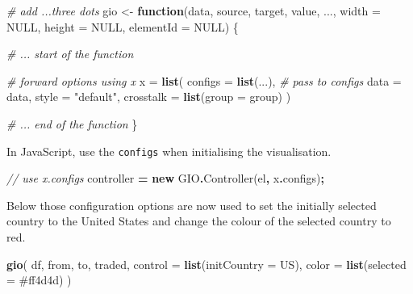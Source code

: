 \documentclass[
]{krantz}
\makeatletter
\newenvironment{Shaded}{\begin{snugshade}}{\end{snugshade}}
\newcommand{\AttributeTok}[1]{\textcolor[rgb]{0.61,0.61,0.61}{#1}}
\newcommand{\CommentTok}[1]{\textcolor[rgb]{0.37,0.37,0.37}{\textit{#1}}}
\newcommand{\ControlFlowTok}[1]{\textcolor[rgb]{0.27,0.27,0.27}{\textbf{#1}}}
\newcommand{\DataTypeTok}[1]{\textcolor[rgb]{0.27,0.27,0.27}{#1}}
\newcommand{\FunctionTok}[1]{\textcolor[rgb]{0,0,0}{#1}}
\newcommand{\KeywordTok}[1]{\textcolor[rgb]{0.27,0.27,0.27}{\textbf{#1}}}
\newcommand{\NormalTok}[1]{#1}
\newcommand{\OperatorTok}[1]{\textcolor[rgb]{0.43,0.43,0.43}{\textbf{#1}}}
\newcommand{\OtherTok}[1]{\textcolor[rgb]{0.37,0.37,0.37}{#1}}
\newcommand{\StringTok}[1]{\textcolor[rgb]{0.5,0.5,0.5}{#1}}
\newenvironment{kframe}{%
\medskip{}
\setlength{\fboxsep}{.8em}
 \def\at@end@of@kframe{}%
 \ifinner\ifhmode%
  \def\at@end@of@kframe{\end{minipage}}%
  \begin{minipage}{\columnwidth}%
 \fi\fi%
 \def\FrameCommand##1{\hskip\@totalleftmargin \hskip-\fboxsep
 \colorbox{shadecolor}{##1}\hskip-\fboxsep
     \hskip-\linewidth \hskip-\@totalleftmargin \hskip\columnwidth}%
 \MakeFramed {\advance\hsize-\width
   \@totalleftmargin\z@ \linewidth\hsize
   \@setminipage}}%
 {\par\unskip\endMakeFramed%
 \at@end@of@kframe}
\renewenvironment{Shaded}{\begin{kframe}}{\end{kframe}}
\makeatother
\begin{document}
\begin{Shaded}
\begin{Highlighting}[]
\CommentTok{\# add ...three dots}
\NormalTok{gio \textless{}{-}}\StringTok{ }\ControlFlowTok{function}\NormalTok{(data, source, target, value, ..., }
  \DataTypeTok{width =} \OtherTok{NULL}\NormalTok{, }\DataTypeTok{height =} \OtherTok{NULL}\NormalTok{, }\DataTypeTok{elementId =} \OtherTok{NULL}\NormalTok{) \{}

  \CommentTok{\# ... start of the function}

  \CommentTok{\# forward options using x}
\NormalTok{  x =}\StringTok{ }\KeywordTok{list}\NormalTok{(}
    \DataTypeTok{configs =} \KeywordTok{list}\NormalTok{(...), }\CommentTok{\# pass to configs}
    \DataTypeTok{data =}\NormalTok{ data,}
    \DataTypeTok{style =} \StringTok{"default"}\NormalTok{,}
    \DataTypeTok{crosstalk =} \KeywordTok{list}\NormalTok{(}\DataTypeTok{group =}\NormalTok{ group)}
\NormalTok{  )}

  \CommentTok{\# ... end of the function}
\NormalTok{\}}
\end{Highlighting}
\end{Shaded}

In JavaScript, use the \texttt{configs} when initialising the visualisation.

\begin{Shaded}
\begin{Highlighting}[]
\CommentTok{// use x.configs}
\NormalTok{controller }\OperatorTok{=} \KeywordTok{new}\NormalTok{ GIO}\OperatorTok{.}\FunctionTok{Controller}\NormalTok{(el}\OperatorTok{,}\NormalTok{ x}\OperatorTok{.}\AttributeTok{configs}\NormalTok{)}\OperatorTok{;}
\end{Highlighting}
\end{Shaded}

Below those configuration options are now used to set the initially selected country to the United States and change the colour of the selected country to red.

\begin{Shaded}
\begin{Highlighting}[]
\KeywordTok{gio}\NormalTok{(}
\NormalTok{  df, from, to, traded, }
  \DataTypeTok{control =} \KeywordTok{list}\NormalTok{(}\DataTypeTok{initCountry =} \StringTok{\textquotesingle{}US\textquotesingle{}}\NormalTok{), }
  \DataTypeTok{color =} \KeywordTok{list}\NormalTok{(}\DataTypeTok{selected =} \StringTok{\textquotesingle{}\#ff4d4d\textquotesingle{}}\NormalTok{)}
\NormalTok{) }
\end{Highlighting}
\end{Shaded}
\end{document}
